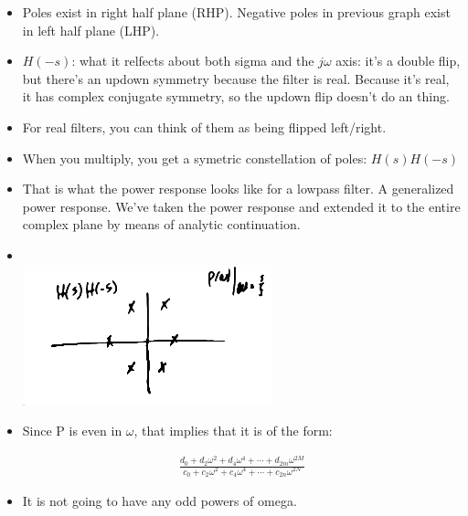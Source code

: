 \begin{itemize}
    \item{Poles exist in right half plane (RHP). Negative poles in previous graph
        exist in left half plane (LHP).}

\item{$H(-s)$: what it relfects about both sigma and the $j\omega$ axis: it's a
double flip, but there's an updown symmetry because the filter is real. Because
it's real, it has complex conjugate symmetry, so the updown flip doesn't do an thing.}


\item{For real filters, you can think of them as being flipped left/right.}

\item{When you multiply, you get a symetric constellation of poles:
    $H(s)H(-s)$}

\item{That is what the power response looks like for a lowpass filter. A generalized
power response. We've taken the power response and extended it to the entire 
complex plane by means of analytic continuation. }

\item{\\
    \includegraphics[scale=0.5]{frames/14c}\\}

\item{Since P is even in $\omega$, that implies that it is of the form:

\begin{align}
    \frac{
        d_0 + d_2\omega^2 + d_4\omega^4 + \cdots + d_{2m}\omega^{2M} 
    }{
        c_0 + c_2\omega^2 + c_4\omega^4 + \cdots + c_{2n}\omega^{2N} 
    }
\end{align}
}


\item{It is not going to have any odd powers of omega. }


\end{itemize}

